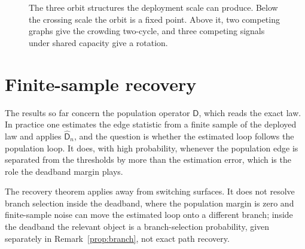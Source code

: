 \documentclass[11pt]{article}
\theoremstyle{plain}
\theoremstyle{definition}
\newcommand{\Dop}{\mathsf{D}}
\newcommand{\Dhat}{\widehat{\mathsf{D}}}
\begin{document}
\begin{figure}[t]
\centering
{}
\caption{The three orbit structures the deployment scale can produce. Below the crossing scale the orbit is a fixed point. Above it, two competing graphs give the crowding two-cycle, and three competing signals under shared capacity give a rotation.}
\label{fig:orbits}
\end{figure}

\section{Finite-sample recovery}\label{sec:finitesample}

The results so far concern the population operator $\Dop$, which reads the exact law. In practice one estimates the edge statistic from a finite sample of the deployed law and applies $\Dhat_n$, and the question is whether the estimated loop follows the population loop. It does, with high probability, whenever the population edge is separated from the thresholds by more than the estimation error, which is the role the deadband margin plays.

The recovery theorem applies away from switching surfaces. It does not resolve branch selection inside the deadband, where the population margin is zero and finite-sample noise can move the estimated loop onto a different branch; inside the deadband the relevant object is a branch-selection probability, given separately in Remark~\ref{prop:branch}, not exact path recovery.
\end{document}
